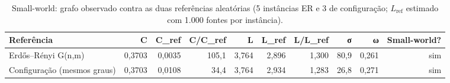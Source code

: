\begin{table}[!htb]
\centering
\caption{Small-world: grafo observado contra as duas referências aleatórias (5 instâncias ER e 3 de configuração; $L_{\text{ref}}$ estimado com 1.000 fontes por instância).}
\label{tab:smallworld}
\begin{adjustbox}{max width=\linewidth}
\begin{tabular}{lrrrrrrrrr}
\toprule
Referência & C & C\_ref & C/C\_ref & L & L\_ref & L/L\_ref & σ & ω & Small-world? \\
\midrule
Erdős–Rényi G(n,m) & 0,3703 & 0,0035 & 105,1 & 3,764 & 2,896 & 1,300 & 80,9 & 0,261 & sim \\
Configuração (mesmos graus) & 0,3703 & 0,0108 & 34,4 & 3,764 & 2,934 & 1,283 & 26,8 & 0,271 & sim \\
\bottomrule
\end{tabular}
\end{adjustbox}
\end{table}
